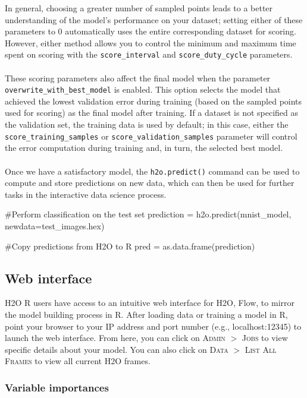 \documentclass{article}[11pt]
\begin{document}
In general, choosing a greater number of sampled points leads to a better understanding of the model's performance on your dataset; setting either of these parameters to 0 automatically uses the entire corresponding dataset for scoring. However, either method allows you to control the minimum
and maximum time spent on scoring with the \texttt{score\_interval} and \texttt{score\_duty\_cycle} parameters.
\\
\\
These scoring parameters also affect the final model when the parameter \texttt{overwrite\_with\_best\_model} is enabled. This option selects the model that achieved the lowest validation error during training (based on the sampled points used for scoring) as the final model after training. If a dataset is not specified as the validation set, the training data is used by default; in this case, either the \texttt{score\_training\_samples} or \texttt{score\_validation\_samples} parameter will control the error computation during training and, in turn, the selected best model.
\\
\\
Once we have a satisfactory model, the \texttt{h2o.predict()} command can be used to compute and store predictions on new data, which can then be used for further tasks in the interactive data science process.
\begin{spverbatim}
#Perform classification on the test set
prediction = h2o.predict(mnist_model, newdata=test_images.hex)

#Copy predictions from H2O to R
pred = as.data.frame(prediction)

\end{spverbatim}


\subsection{Web interface} 

H2O R users have access to an intuitive web interface for H2O, Flow, to mirror the model building process in R. After loading data or training a model in R, point your browser to your IP address and port number (e.g., localhost:12345) to launch the web interface. From here, you can click on \textsc{Admin} $>$ \textsc{Jobs} to view specific details about your model. You can also click on \textsc{Data} $>$ \textsc{List All Frames} to view all current H2O frames. 

\subsubsection{Variable importances} 
\end{document}
